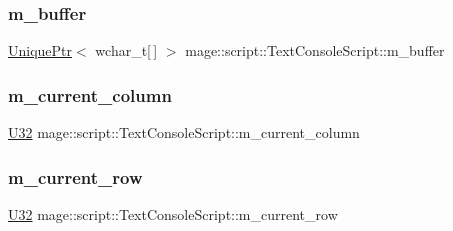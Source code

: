 \subsubsection{\texorpdfstring{m\+\_\+buffer}{m\_buffer}}
{\footnotesize\ttfamily \hyperlink{namespacemage_a3316d7143a973e37adf1110f2e80ca31}{Unique\+Ptr}$<$ wchar\+\_\+t\mbox{[}$\,$\mbox{]} $>$ mage\+::script\+::\+Text\+Console\+Script\+::m\+\_\+buffer\hspace{0.3cm}{\ttfamily [private]}}

\hypertarget{classmage_1_1script_1_1_text_console_script_a10d396ae897b441a7cfc1f77c50eb16e}{}\label{classmage_1_1script_1_1_text_console_script_a10d396ae897b441a7cfc1f77c50eb16e} 
\subsubsection{\texorpdfstring{m\+\_\+current\+\_\+column}{m\_current\_column}}
{\footnotesize\ttfamily \hyperlink{namespacemage_a41c104c036fba3756a74e19f793eeaa1}{U32} mage\+::script\+::\+Text\+Console\+Script\+::m\+\_\+current\+\_\+column\hspace{0.3cm}{\ttfamily [private]}}

\hypertarget{classmage_1_1script_1_1_text_console_script_abd3f8ee3c17545968fcf403ec9aef83d}{}\label{classmage_1_1script_1_1_text_console_script_abd3f8ee3c17545968fcf403ec9aef83d} 
\subsubsection{\texorpdfstring{m\+\_\+current\+\_\+row}{m\_current\_row}}
{\footnotesize\ttfamily \hyperlink{namespacemage_a41c104c036fba3756a74e19f793eeaa1}{U32} mage\+::script\+::\+Text\+Console\+Script\+::m\+\_\+current\+\_\+row\hspace{0.3cm}{\ttfamily [private]}}

\hypertarget{classmage_1_1script_1_1_text_console_script_af9962aa57cbbe3b8bbc2217d2f28112b}{}\label{classmage_1_1script_1_1_text_console_script_af9962aa57cbbe3b8bbc2217d2f28112b} 
